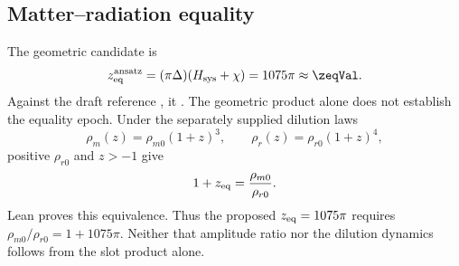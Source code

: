 \subsection{Matter--radiation equality}
The geometric candidate is
\begin{equation}
z_{\rm eq}^{\rm ansatz}=(\pi\Delta)(H_{\rm sys}+\chi)
=1075\pi\approx\zeqVal.
\end{equation}
Against the draft reference \zeqExperimentalValue, it \zeqAccText. The geometric product alone does not establish the equality epoch. Under the separately supplied dilution laws
\begin{equation}
\rho_m(z)=\rho_{m0}(1+z)^3,\qquad
\rho_r(z)=\rho_{r0}(1+z)^4,
\end{equation}
positive $\rho_{r0}$ and $z>-1$ give
\begin{equation}
1+z_{\rm eq}=\frac{\rho_{m0}}{\rho_{r0}}.
\end{equation}
Lean proves this equivalence. Thus the proposed $z_{\rm eq}=1075\pi$ requires $\rho_{m0}/\rho_{r0}=1+1075\pi$. Neither that amplitude ratio nor the dilution dynamics follows from the slot product alone.
